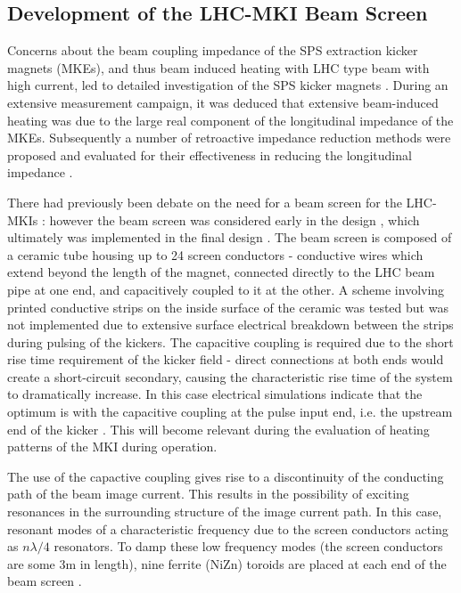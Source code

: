 \subsection{Development of the LHC-MKI Beam Screen}
\label{sec:mki-screen-development}

Concerns about the beam coupling impedance of the SPS extraction kicker magnets (MKEs), and thus beam induced heating with LHC type beam with high current, led to detailed investigation of the SPS kicker magnets \cite{Arduini:beamInducedSPS}. During an extensive measurement campaign, it was deduced that extensive beam-induced heating was due to the large real component of the longitudinal impedance of the MKEs. Subsequently a number of retroactive impedance reduction methods were proposed and evaluated for their effectiveness in reducing the longitudinal impedance \cite{Kroyer:MKEReduct}.

There had previously been debate on the need for a beam screen for the LHC-MKIs \cite{Vos:beamScreen}: however the beam screen was considered early in the design \cite{Ducimetiere:designMKI}, which ultimately was implemented in the final design \cite{Barnes:improvBeamScreen}. The beam screen is composed of a ceramic tube housing up to 24 screen conductors - conductive wires which extend beyond the length of the magnet, connected directly to the LHC beam pipe at one end, and capacitively coupled to it at the other. A scheme involving printed conductive strips on the inside surface of the ceramic was tested but was not implemented due to extensive surface electrical breakdown between the strips during pulsing of the kickers. The capacitive coupling is required due to the short rise time requirement of the kicker field - direct connections at both ends would create a short-circuit secondary, causing the characteristic rise time of the system to dramatically increase. In this case electrical simulations indicate that the optimum is with the capacitive coupling at the pulse input end, i.e. the upstream end of the kicker \cite{Barnes:improvBeamScreen}. This will become relevant during the evaluation of heating patterns of the MKI during operation.

The use of the capactive coupling gives rise to a discontinuity of the conducting path of the beam image current. This results in the possibility of exciting resonances in the surrounding structure of the image current path. In this case, resonant modes of a characteristic frequency due to the screen conductors acting as $n \lambda /4$ resonators. To damp these low frequency modes (the screen conductors are some 3m in length), nine ferrite (NiZn) toroids are placed at each end of the beam screen \cite{Caspers:impMeasMKI, Caspera:impMeasLowFreqMKI, Barnes:mkiVacTemp}. 

